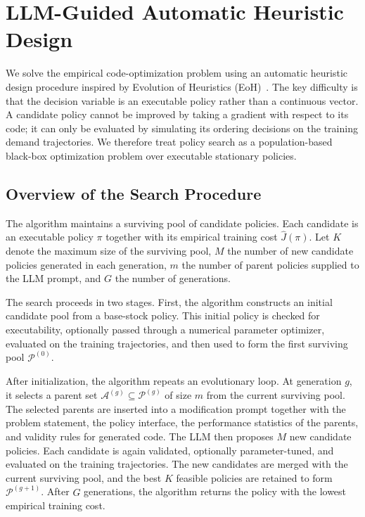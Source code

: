 \documentclass[11pt]{article}
\begin{document}
\setcounter{section}{2}
\section{LLM-Guided Automatic Heuristic Design}
\label{sec:methodology}

We solve the empirical code-optimization problem using an automatic heuristic design procedure inspired by Evolution of Heuristics (EoH)~\citep{liu2024eoh}. The key difficulty is that the decision variable is an executable policy rather than a continuous vector. A candidate policy cannot be improved by taking a gradient with respect to its code; it can only be evaluated by simulating its ordering decisions on the training demand trajectories. We therefore treat policy search as a population-based black-box optimization problem over executable stationary policies.

\subsection{Overview of the Search Procedure}
\label{sec:method_overview}

The algorithm maintains a surviving pool of candidate policies. Each candidate is an executable policy $\pi$ together with its empirical training cost $\hat J(\pi)$. Let $K$ denote the maximum size of the surviving pool, $M$ the number of new candidate policies generated in each generation, $m$ the number of parent policies supplied to the LLM prompt, and $G$ the number of generations.

The search proceeds in two stages. First, the algorithm constructs an initial candidate pool from a base-stock policy. This initial policy is checked for executability, optionally passed through a numerical parameter optimizer, evaluated on the training trajectories, and then used to form the first surviving pool $\mathcal P^{(0)}$.

After initialization, the algorithm repeats an evolutionary loop. At generation $g$, it selects a parent set $\mathcal A^{(g)} \subseteq \mathcal P^{(g)}$ of size $m$ from the current surviving pool. The selected parents are inserted into a modification prompt together with the problem statement, the policy interface, the performance statistics of the parents, and validity rules for generated code. The LLM then proposes $M$ new candidate policies. Each candidate is again validated, optionally parameter-tuned, and evaluated on the training trajectories. The new candidates are merged with the current surviving pool, and the best $K$ feasible policies are retained to form $\mathcal P^{(g+1)}$. After $G$ generations, the algorithm returns the policy with the lowest empirical training cost.
\end{document}
